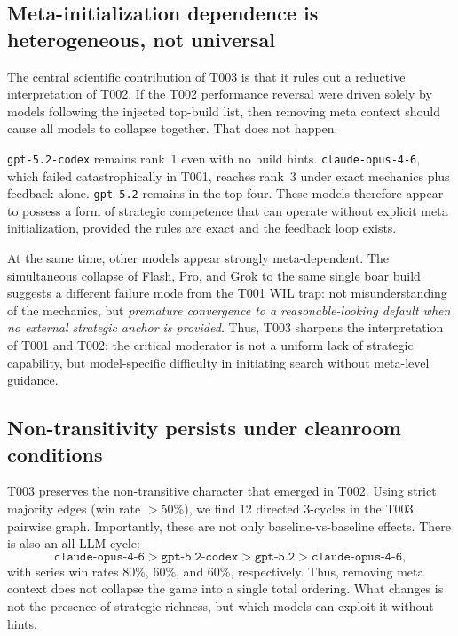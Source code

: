 \documentclass[11pt]{article}
\newcommand{\tOne}{T001}
\newcommand{\tTwo}{T002}
\newcommand{\tThree}{T003}
\begin{document}
\subsection{Meta-initialization dependence is heterogeneous, not universal}

The central scientific contribution of \tThree{} is that it rules out a reductive interpretation of \tTwo.
If the \tTwo{} performance reversal were driven solely by models following the injected top-build list, then removing meta context should cause all models to collapse together.
That does not happen.

\texttt{gpt-5.2-codex} remains rank~1 even with no build hints.
\texttt{claude-opus-4-6}, which failed catastrophically in \tOne, reaches rank~3 under exact mechanics plus feedback alone.
\texttt{gpt-5.2} remains in the top four.
These models therefore appear to possess a form of strategic competence that can operate without explicit meta initialization, provided the rules are exact and the feedback loop exists.

At the same time, other models appear strongly meta-dependent.
The simultaneous collapse of Flash, Pro, and Grok to the same single boar build suggests a different failure mode from the \tOne{} WIL trap:
not misunderstanding of the mechanics, but \emph{premature convergence to a reasonable-looking default when no external strategic anchor is provided}.
Thus, \tThree{} sharpens the interpretation of \tOne{} and \tTwo:
the critical moderator is not a uniform lack of strategic capability, but model-specific difficulty in initiating search without meta-level guidance.

\subsection{Non-transitivity persists under cleanroom conditions}

\tThree{} preserves the non-transitive character that emerged in \tTwo.
Using strict majority edges (win rate $>$50\%), we find 12 directed 3-cycles in the \tThree{} pairwise graph.
Importantly, these are not only baseline-vs-baseline effects.
There is also an all-LLM cycle:
\[
\texttt{claude-opus-4-6} > \texttt{gpt-5.2-codex} > \texttt{gpt-5.2} > \texttt{claude-opus-4-6},
\]
with series win rates 80\%, 60\%, and 60\%, respectively.
Thus, removing meta context does not collapse the game into a single total ordering.
What changes is not the presence of strategic richness, but which models can exploit it without hints.
\end{document}
